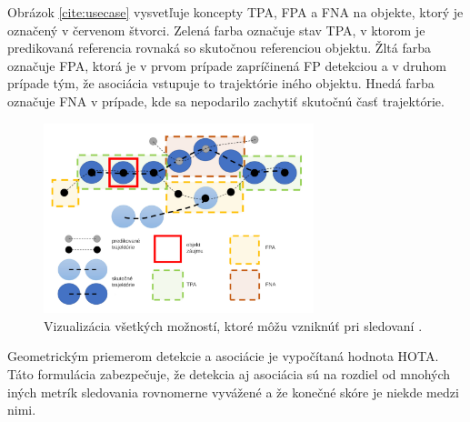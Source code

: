 
Obrázok \ref{cite:usecase} vysvetľuje koncepty TPA, FPA a FNA na objekte, ktorý je označený v červenom štvorci. Zelená farba označuje stav TPA, v ktorom je predikovaná referencia rovnaká so skutočnou referenciou objektu. Žltá farba označuje FPA, ktorá je v prvom prípade zapríčinená FP detekciou a v druhom prípade tým, že asociácia vstupuje to trajektórie iného objektu. Hnedá farba označuje FNA v prípade, kde sa nepodarilo zachytiť skutočnú časť trajektórie.

\begin{figure}[ht]
    \centering
    \includegraphics[width=0.7\textwidth]{images/05/usecase.png}
    \caption{Vizualizácia všetkých možností, ktoré môžu vzniknúť pri sledovaní \cite{hota}.}
    \label{img:usecase}
\end{figure}

Geometrickým priemerom detekcie a asociácie je vypočítaná hodnota HOTA. Táto formulácia zabezpečuje, že detekcia aj asociácia sú na rozdiel od mnohých iných metrík sledovania rovnomerne vyvážené a že konečné skóre je niekde medzi nimi.

